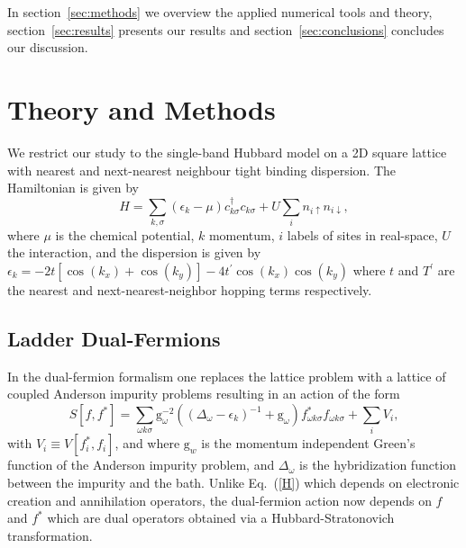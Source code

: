 \documentclass[twocolumn,notitlepage,prb,superscriptaddress,showpacs]{revtex4-1}
\begin{document}
In section~\ref{sec:methods} we overview the applied numerical tools and theory, section~\ref{sec:results} presents our results and section~\ref{sec:conclusions} concludes our discussion.





\section{Theory and Methods \label{sec:methods}}

We restrict our study to the single-band Hubbard model on a 2D square lattice with nearest and next-nearest neighbour tight binding dispersion.\cite{benchmarks}  The Hamiltonian is given by
\begin{equation}
H = \sum_{k,\sigma} \left(\epsilon_{k} -\mu\right)c_{k\sigma}^\dagger c_{k\sigma}+U\sum_i n_{i\uparrow}n_{i\downarrow},
\label{H}
\end{equation}
where $\mu$ is the chemical potential, $k$ momentum, $i$ labels of sites in real-space, $U$ the interaction, and the dispersion is given by
$\epsilon_k=-2t\left[\cos(k_x)+\cos(k_y)\right]-4t^\prime \cos(k_x)\cos(k_y)$ where $t$ and $T^\prime$ are the nearest and next-nearest-neighbor hopping terms respectively.




\subsection{Ladder Dual-Fermions}
In the dual-fermion formalism\cite{rubtsov:2008,opendf} one replaces the lattice problem with a lattice of coupled Anderson impurity problems resulting in an action of the form
\begin{equation}
    S[f,f^*]= \sum_{\omega k \sigma}\text{g}_\omega^{-2} \left((\Delta_\omega - \epsilon_k)^{-1}
    +\text{g}_\omega\right) f^*_{\omega k \sigma} f_{\omega
    k \sigma} + \sum_i V_i,
\end{equation}
with $V_i\equiv V[f^*_i,f_i]$, and where $\text{g}_w$ is the momentum independent Green's function of the Anderson impurity problem, and $\Delta_\omega$ is the hybridization function between the impurity and the bath.\cite{georges:1996,rubtsov:2008}  Unlike Eq.~(\ref{H}) which depends on electronic creation and annihilation operators, the dual-fermion action now depends on $f$ and $f^*$ which are dual operators obtained via a Hubbard-Stratonovich transformation.  
\end{document}
